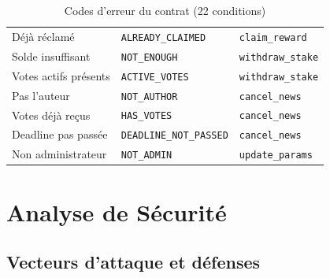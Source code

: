 \documentclass[12pt,a4paper]{article}
\begin{document}
\begin{table}[H]
\begin{tabular}{L{4.5cm} L{4.5cm} L{3.5cm}}
Déjà réclamé               & \texttt{ALREADY\_CLAIMED}      & \texttt{claim\_reward} \\
Solde insuffisant          & \texttt{NOT\_ENOUGH}           & \texttt{withdraw\_stake} \\
Votes actifs présents      & \texttt{ACTIVE\_VOTES}         & \texttt{withdraw\_stake} \\
Pas l'auteur               & \texttt{NOT\_AUTHOR}           & \texttt{cancel\_news} \\
Votes déjà reçus           & \texttt{HAS\_VOTES}            & \texttt{cancel\_news} \\
Deadline pas passée        & \texttt{DEADLINE\_NOT\_PASSED} & \texttt{cancel\_news} \\
Non administrateur         & \texttt{NOT\_ADMIN}            & \texttt{update\_params} \\
\bottomrule
\end{tabular}
\caption{Codes d'erreur du contrat (22 conditions)}
\end{table}

\section{Analyse de Sécurité}

\subsection{Vecteurs d'attaque et défenses}
\end{document}
